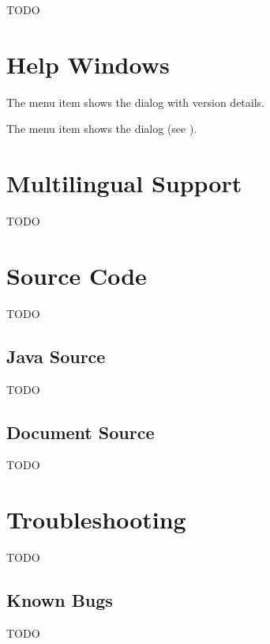 TODO


\chapter{Help Windows}
\label{sec:helpwindows}


The  menu item shows the 
dialog with version details.


The  menu item shows the 
dialog (see ).



\chapter{Multilingual Support}\label{sec:multilingualsupport}

TODO


\chapter{Source Code}\label{sec:sourcecode}

TODO


\section{Java Source}\label{sec:javasource}

TODO


\section{Document Source}\label{sec:docsource}

TODO


\chapter{Troubleshooting}\label{sec:troubleshooting}

TODO


\section{Known Bugs}\label{sec:knownbugs}

TODO

\chapter{}
\label{sec:licence}

